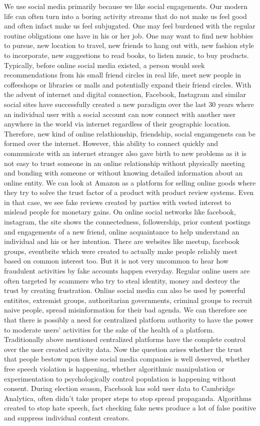 \documentclass[a4paper]{article}
\begin{document}
We use social media primarily because we like social engagements. Our modern life can often turn into a boring activity streams that do not make us feel good and often infact make us feel subjugated. One may feel burdened with the regular routine obligations one have in his or her job. One may want to find new hobbies to pursue, new location to travel, new friends to hang out with, new fashion style to incorporate, new suggestions to read books, to listen music, to buy products. Typically, before online social media existed, a person would seek recommendations from his small friend circles in real life, meet new people in coffeeshops or libraries or malls and potentially expand their friend circles. With the advent of internet and digital connection, Facebook, Instagram and similar social sites have successfully created a new paradigm over the last 30 years where an individual user with a social account can now connect with another user anywhere in the world via internet regardless of their geographic location. Therefore, new kind of online relathionship, friendship, social engamgenets can be formed over the internet. However, this ability to connect quickly and communicate with an internet stranger also gave birth to new problems as it is not easy to trust someone in an online relationship without physically meeting and bonding with someone or without knowing detailed information about an online entity. We can look at Amazon as a platform for selling online goods where they try to solve the trust factor of a product with product review systems. Even in that case, we see fake reviews created by parties with vested interest to mislead people for monetary gains. On online social networks like facebook, instagram, the site shows the connectedness, followership, prior content postings and engagements of a new friend, online acquaintance to help understand an individual and his or her intention. There are websites like meetup, facebook groups, eventbrite which were created to actually make people reliably meet based on common interest too. But it is not very uncommon to hear how fraudulent activities by fake accounts happen everyday. Regular online users are often targeted by scammers who try to steal identity, money and destroy the trust by creating frustration. Online social media can also be used by powerful entitites, extremist groups, authoritarian governments, criminal groups to recruit naive people, spread misinformation for their bad agenda. We can therefore see that there is possibly a need for centralized platform authority to have the power to moderate users' activities for the sake of the health of a platform. Traditionally above mentioned centralized platforms have the complete control over the user created activity data. Now the question arises whether the trust that people bestow upon these social media companies is well deserved, whether free speech violation is happening, whether algorithmic manipulation or experimentation to psychologically control population is happening without consent. During election season, Facebook has sold user data to Cambridge Analytica, often didn't take proper steps to stop spread propaganda. Algorithms created to stop hate speech, fact checking fake news produce a lot of false positive and suppress individual content creators. 
\end{document}
